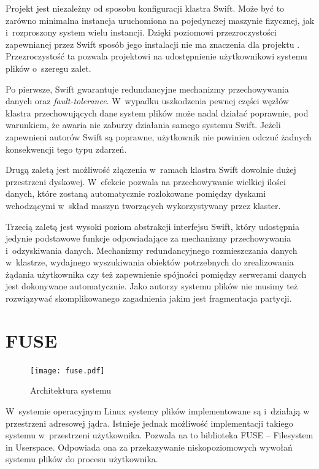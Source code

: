 Projekt \cb{} jest niezależny od sposobu konfiguracji klastra Swift. Może być to
zarówno minimalna instancja uruchomiona na pojedynczej maszynie fizycznej, jak
i~rozproszony system wielu instancji. Dzięki poziomowi przezroczystości
zapewnianej przez Swift sposób jego instalacji nie ma znaczenia dla projektu
\cb{}. Przezroczystość ta pozwala projektowi \cb{} na udostępnienie
użytkownikowi systemu plików o~szeregu zalet.

Po pierwsze, Swift gwarantuje redundancyjne mechanizmy przechowywania danych
oraz \textit{fault-tolerance}. W~wypadku uszkodzenia pewnej części węzłów
klastra przechowujących dane system plików \cb{} może nadal działać poprawnie,
pod warunkiem, że awaria nie zaburzy działania samego systemu Swift. Jeżeli
zapewnieni autorów Swift są poprawne, użytkownik nie powinien odczuć żadnych
konsekwencji tego typu zdarzeń.

Drugą zaletą jest możliwość złączenia w~ramach klastra Swift dowolnie dużej
przestrzeni dyskowej. W~efekcie \cb{} pozwala na przechowywanie wielkiej ilości
danych, które zostaną automatycznie rozlokowane pomiędzy dyskami wchodzącymi
w~skład maszyn tworzących wykorzystywany przez \cb{} klaster.

Trzecią zaletą jest wysoki poziom abstrakcji interfejsu Swift, który udostępnia
jedynie podstawowe funkcje odpowiadające za mechanizmy przechowywania
i~odzyskiwania danych. Mechanizmy redundancyjnego rozmieszczania danych
w~klastrze, wydajnego wyszukiwania obiektów potrzebnych do zrealizowania żądania
użytkownika czy też zapewnienie spójności pomiędzy serwerami danych jest
dokonywane automatycznie. Jako autorzy systemu plików nie musimy też rozwiązywać
skomplikowanego zagadnienia jakim jest fragmentacja partycji.

\section{FUSE}

\begin{figure}
	\centering
	\texttt{[image: fuse.pdf]}
	\caption{Architektura systemu}
	\label{fig:fuse}
\end{figure}

W~systemie operacyjnym Linux systemy plików implementowane są i~działają w
przestrzeni adresowej jądra. Istnieje jednak możliwość implementacji takiego
systemu w~przestrzeni użytkownika. Pozwala na to biblioteka FUSE -- Filesystem
in Userspace. Odpowiada ona za przekazywanie niskopoziomowych wywołań systemu
plików do procesu użytkownika.

